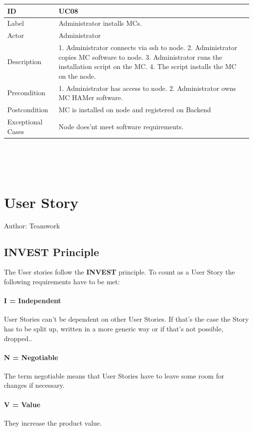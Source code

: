 \documentclass{scrreprt}
\begin{document}
\begin{tabularx}{12cm}{l|X}
	ID & UC08  \\
	\hline
	Label & 
	Administrator installs MCs. \\
	\hline
	Actor            & Administrator    \\
	\hline
	Description            &  	1. Administrator connects via ssh to node. 2. Administrator copies MC software to node. 3. Administrator runs the installation script on the MC. 4. The script installs the MC on the node. 
	\\
	\hline
	Precondition           & 1. Administrator has access to node. 2. Administrator owns MC HAMer software.  \\
	\hline
	Postcondition     &  MC is installed on node and registered on Backend \\
	\hline
	Exceptional Cases & Node does'nt meet software requirements. 
	
\end{tabularx}
\\
\\ \\


\section{User Story}
Author: Teamwork
\subsection{INVEST Principle}
The User stories follow the \textbf{INVEST} principle. To count as a User Story the following requirements have to be met: 

\paragraph{I = Independent} User Stories can't be dependent on other User Stories. If that's the case the Story has to be split up, written in a more generic way or if that's not possible, dropped..
\paragraph{N = Negotiable} The term negotiable means that User Stories have to leave some room for changes if necessary.
\paragraph{V = Value} They increase the product value. 
\end{document}
